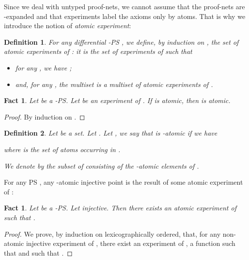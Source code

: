 \documentclass{article}
\theoremstyle{plain}
\newtheorem{definition}{Definition}
\newtheorem{fact}[theorem]{Fact}
\begin{document}
Since we deal with untyped proof-nets, we cannot assume that the proof-nets are -expanded and that experiments label the axioms only by atoms. That is why we introduce the notion of \emph{atomic experiment}:

\begin{definition}
For any differential -PS , we define, by induction on , the set of \emph{atomic experiments of }: it is the set of experiments  of  such that
\begin{itemize}
\item for any , we have ;
\item and, for any , the multiset  is a multiset of atomic experiments of .
\end{itemize}
\end{definition}

\begin{fact}\label{fact: an experiment of a flat-pS induces an experiment of differential flat-PS}
Let  be a -PS. Let  be an experiment of . If  is atomic, then  is atomic.
\end{fact}

\begin{proof}
By induction on .
\end{proof}

\begin{definition}
Let  be a set. Let . 
Let , we say that  is \emph{-atomic} if we have 

where  is the set of atoms occurring in .

We denote by  the subset of  consisting of the -atomic elements of .
\end{definition}

For any PS , any -atomic injective point is the result of some atomic experiment of :

\begin{fact}\label{fact: from point to experiment}
Let  be a -PS. Let  injective. Then there exists an atomic experiment  of  such that .
\end{fact}

\begin{proof}
We prove, by induction on  lexicographically ordered, that, for any non-atomic injective experiment  of , there exist an experiment  of , a function  such that  and  such that .
\end{proof}
\end{document}
